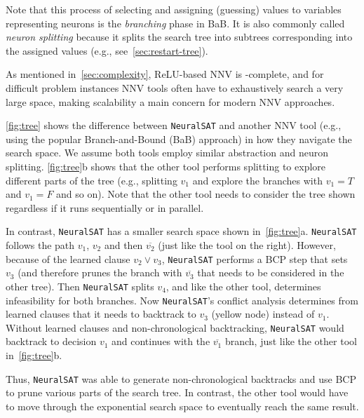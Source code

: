 \documentclass[oneside,11pt,dvipsnames]{book}
\numberwithin{equation}{section}
\theoremstyle{definition}
\theoremstyle{remark}
\newcommand{\tvn}[1]{\iftoggle{usecomment}{{\color{red}{[TVN]: #1}}}{}}
\newcommand{\hd}[1]{\iftoggle{usecomment}{{\color{blue}{[HD]: #1}}}{}}
\newcommand{\tool}{\texttt{NeuralSAT}}
\begin{document}
\tvn{rewrite: technically we don't split if the guess was right}
Note that this process of selecting and assigning (guessing) values to variables representing neurons is the \emph{branching} phase in BaB. It is also commonly called \emph{neuron splitting} because  it splits the search tree into subtrees corresponding into the assigned values (e.g., see~\autoref{sec:restart-tree}).


As mentioned in~\autoref{sec:complexity}, ReLU-based NNV is \NP-complete, and for difficult problem instances NNV tools often have to exhaustively search a very large space, making scalability a main concern for modern NNV approaches.


\autoref{fig:tree} shows the difference between \tool{} and another NNV tool (e.g., using the popular Branch-and-Bound (BaB) approach) in how they navigate the search space.  We assume both tools employ similar abstraction and neuron splitting.
\autoref{fig:tree}b shows that the other tool performs splitting to explore different parts of the tree (e.g., splitting $v_1$ and explore the branches with $v_1=T$ and $v_1=F$ and so on). Note that the other tool needs to consider the tree shown regardless if it runs sequentially or in parallel.

In contrast, \tool{} has a smaller search space shown in~\autoref{fig:tree}a.
\tool{} follows the path $v_1$, $v_2$ and then $\overline{v_2}$ (just like the tool on the right).
However, because of the learned clause $v_2\lor v_3$, \tool{} performs a BCP step that sets $v_3$ (and therefore prunes the branch with $\overline{v_3}$ that needs to be considered in the other tree).
Then \tool{} splits $v_4$, and like the other tool, determines infeasibility for both branches. Now \tool{}'s conflict analysis determines from learned clauses that it needs to backtrack to $v_3$ (yellow node) instead of $v_1$.  Without learned clauses and non-chronological backtracking, \tool{} would backtrack to decision $v_1$ and continues with the $\overline{v_1}$ branch, just like the other tool in~\autoref{fig:tree}b.

Thus, \tool{} was able to generate non-chronological backtracks and use BCP to prune various parts of the search tree.  In contrast, the other tool would have to move through the exponential search space to eventually reach the same result.
\end{document}
